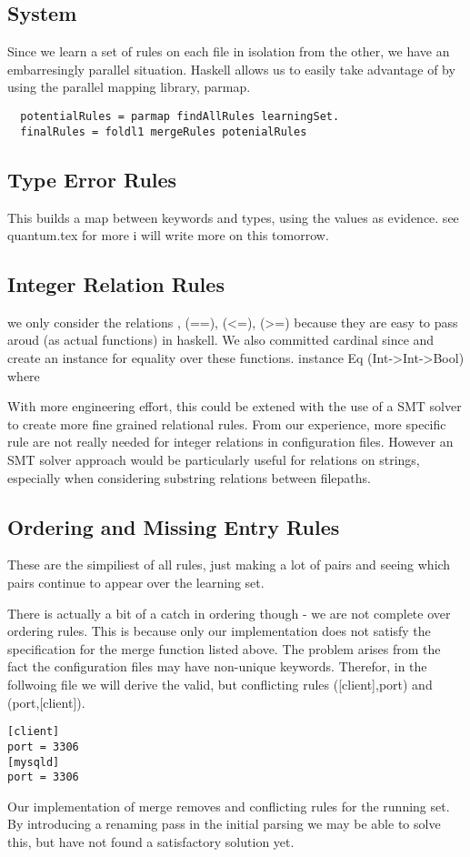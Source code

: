 \subsection{System}
Since we learn a set of rules on each file in isolation from the other, we have an embarresingly parallel situation.
Haskell allows us to easily take advantage of by using the parallel mapping library, parmap.

\begin{lstlisting}
  potentialRules = parmap findAllRules learningSet.
  finalRules = foldl1 mergeRules potenialRules
\end{lstlisting}

\subsection{Type Error Rules}
This builds a map between keywords and types, using the values as evidence.
see quantum.tex for more
i will write more on this tomorrow.

\subsection{Integer Relation Rules}
we only consider the relations , (==), (<=), (>=) because they are easy to pass aroud (as actual functions) in haskell.
We also committed cardinal since and create an instance for equality over these functions.
instance Eq (Int->Int->Bool) where

With more engineering effort, this could be extened with the use of a SMT solver to create more fine grained relational rules.
From our experience, more specific rule are not really needed for integer relations in configuration files.
However an SMT solver approach would be particularly useful for relations on strings, especially when considering substring relations between filepaths.

\subsection{Ordering and Missing Entry Rules}
These are the simpiliest of all rules, just making a lot of pairs and seeing which pairs continue to appear over the learning set.

There is actually a bit of a catch in ordering though - we are not complete over ordering rules.
This is because only our implementation does not satisfy the specification for the merge function listed above.
The problem arises from the fact the configuration files may have non-unique keywords.
Therefor, in the follwoing file we will derive the valid, but conflicting rules ([client],port) and (port,[client]).
\begin{verbatim}
[client]
port = 3306
[mysqld]
port = 3306
\end{verbatim}
Our implementation of merge removes and conflicting rules for the running set.
By introducing a renaming pass in the initial parsing we may be able to solve this, but have not found a satisfactory solution yet.
